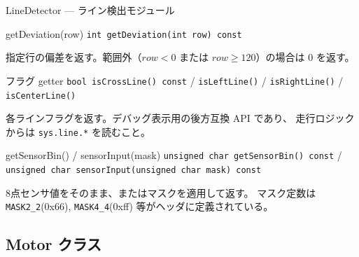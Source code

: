 \documentclass[a4paper,11pt,dvipdfmx]{jsarticle}
\begin{document}
\begin{apibox}{LineDetector --- ライン検出モジュール}
\begin{funcblock}{getDeviation(row)}
\texttt{int getDeviation(int row) const}

\vspace{1.5mm}
指定行の偏差を返す。範囲外（$row < 0$ または $row \geq 120$）の場合は 0 を返す。
\end{funcblock}

\begin{funcblock}{フラグ getter}
\texttt{bool isCrossLine() const} / \texttt{isLeftLine()} / \texttt{isRightLine()} / \texttt{isCenterLine()}

\vspace{1.5mm}
各ラインフラグを返す。デバッグ表示用の後方互換 API であり、
走行ロジックからは \texttt{sys.line.*} を読むこと。
\end{funcblock}

\begin{funcblock}{getSensorBin() / sensorInput(mask)}
\texttt{unsigned char getSensorBin() const} /
\texttt{unsigned char sensorInput(unsigned char mask) const}

\vspace{1.5mm}
8点センサ値をそのまま、またはマスクを適用して返す。
マスク定数は \texttt{MASK2\_2}(0x66), \texttt{MASK4\_4}(0xff) 等がヘッダに定義されている。
\end{funcblock}

\end{apibox}

\subsection{Motor クラス}\label{sec:api-motor}
\end{document}
